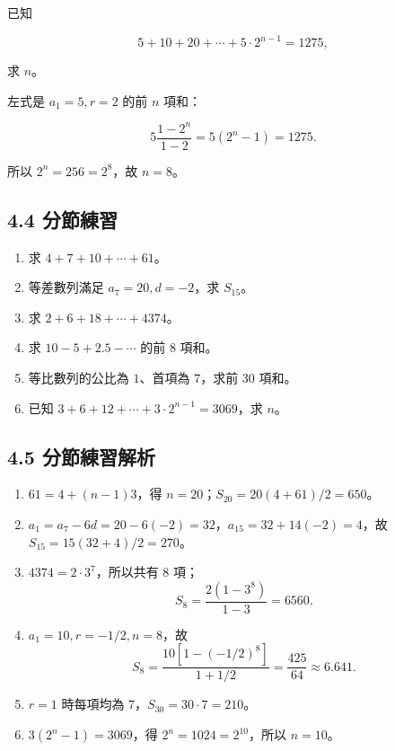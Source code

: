 \documentclass[11pt,a4paper]{article}
\providecommand{\tightlist}{%
  \setlength{\itemsep}{0pt}\setlength{\parskip}{0pt}}
\begin{document}
已知

\[
5+10+20+\cdots+5\cdot2^{n-1}=1275,
\]

求 \(n\)。

左式是 \(a_1=5,r=2\) 的前 \(n\) 項和：

\[
5\frac{1-2^n}{1-2}=5(2^n-1)=1275.
\]

所以 \(2^n=256=2^8\)，故 \(n=8\)。

\subsection{4.4 分節練習}\label{ux5206ux7bc0ux7df4ux7fd2-3}

\begin{enumerate}
\def\labelenumi{\arabic{enumi}.}
\tightlist
\item
  求 \(4+7+10+\cdots+61\)。
\item
  等差數列滿足 \(a_7=20,d=-2\)，求 \(S_{15}\)。
\item
  求 \(2+6+18+\cdots+4374\)。
\item
  求 \(10-5+2.5-\cdots\) 的前 8 項和。
\item
  等比數列的公比為 \(1\)、首項為 \(7\)，求前 30 項和。
\item
  已知 \(3+6+12+\cdots+3\cdot2^{n-1}=3069\)，求 \(n\)。
\end{enumerate}

\subsection{4.5 分節練習解析}\label{ux5206ux7bc0ux7df4ux7fd2ux89e3ux6790-3}

\begin{enumerate}
\def\labelenumi{\arabic{enumi}.}
\tightlist
\item
  \(61=4+(n-1)3\)，得 \(n=20\)；\(S_{20}=20(4+61)/2=650\)。
\item
  \(a_1=a_7-6d=20-6(-2)=32\)，\(a_{15}=32+14(-2)=4\)，故 \(S_{15}=15(32+4)/2=270\)。
\item
  \(4374=2\cdot3^7\)，所以共有 8 項；
  \[
  S_8=\frac{2(1-3^8)}{1-3}=6560.
  \]
\item
  \(a_1=10,r=-1/2,n=8\)，故
  \[
  S_8=\frac{10[1-(-1/2)^8]}{1+1/2}=\frac{425}{64}\approx6.641.
  \]
\item
  \(r=1\) 時每項均為 \(7\)，\(S_{30}=30\cdot7=210\)。
\item
  \(3(2^n-1)=3069\)，得 \(2^n=1024=2^{10}\)，所以 \(n=10\)。
\end{enumerate}
\end{document}
